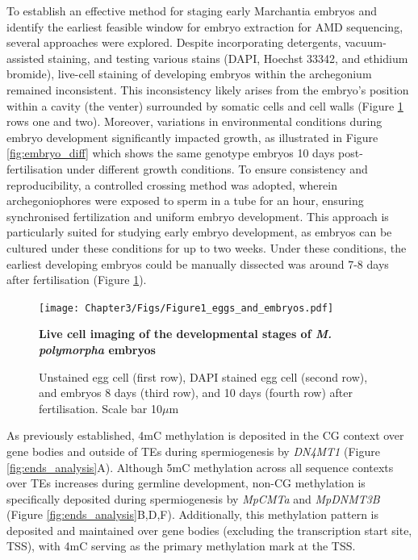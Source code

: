 To establish an effective method for staging early Marchantia embryos and identify the earliest feasible window for embryo extraction for AMD sequencing, several approaches were explored. Despite incorporating detergents, vacuum-assisted staining, and testing various stains (DAPI, Hoechst 33342, and ethidium bromide), live-cell staining of developing embryos within the archegonium remained inconsistent. This inconsistency likely arises from the embryo's position within a cavity (the venter) surrounded by somatic cells and cell walls (Figure \ref{fig:egg_embryo} rows one and two). Moreover, variations in environmental conditions during embryo development significantly impacted growth, as illustrated in Figure \ref{fig:embryo_diff} which shows the same genotype embryos 10 days post-fertilisation under different growth conditions. To ensure consistency and reproducibility, a controlled crossing method was adopted, wherein archegoniophores were exposed to sperm in a tube for an hour, ensuring synchronised fertilization and uniform embryo development. This approach is particularly suited for studying early embryo development, as embryos can be cultured under these conditions for up to two weeks\citep{RN139}. Under these conditions, the earliest developing embryos could be manually dissected was around 7-8 days after fertilisation (Figure \ref{fig:egg_embryo}).

\begin{figure}[htbp!] 
\centering    
    \texttt{[image: Chapter3/Figs/Figure1\_eggs\_and\_embryos.pdf]}
\caption{\textbf{Live cell imaging of the developmental stages of \textit{M. polymorpha} embryos}}
\label{fig:egg_embryo}
\captionsetup{font=small}
    \caption*{Unstained egg cell (first row), DAPI stained egg cell (second row), and embryos 8 days (third row), and 10 days (fourth row) after fertilisation. Scale bar 10$\mu$m}
\end{figure}

As previously established, 4mC methylation is deposited in the CG context over gene bodies and outside of TEs during spermiogenesis by \textit{DN4MT1} (Figure \ref{fig:ends_analysis}A)\citep{RN189}. Although 5mC methylation across all sequence contexts over TEs increases during germline development, non-CG methylation is specifically deposited during spermiogenesis by \textit{MpCMTa} and \textit{MpDNMT3B} (Figure \ref{fig:ends_analysis}B,D,F)\citep{RN189}.  Additionally, this methylation pattern is deposited and maintained over gene bodies (excluding the transcription start site, TSS), with 4mC serving as the primary methylation mark at the TSS. 


